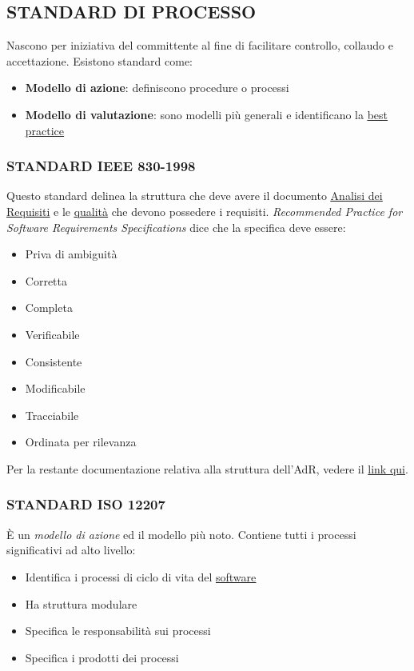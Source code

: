 		\subsection{STANDARD DI PROCESSO}  \label{standard}
		Nascono per iniziativa del committente al fine di facilitare controllo, collaudo e accettazione.
		Esistono standard come:
		\begin{itemize}
			\item \textbf{Modello di azione}: definiscono procedure o processi
			\item \textbf{Modello di valutazione}: sono modelli più generali e identificano la \underline{\hyperref[best]{best practice}}
		\end{itemize}


			\subsubsection{STANDARD IEEE 830-1998}	 \label{ieee830}
			Questo standard delinea la struttura che deve avere il documento \underline{\hyperref[analisideirequisiti]{Analisi dei Requisiti}} e le \underline{\hyperref[qualita]{qualità}} che devono possedere i requisiti.
			\textit{Recommended Practice for Software Requirements Specifications} dice che la specifica deve essere:
				\begin{itemize}
					\item Priva di ambiguità
					\item Corretta
					\item Completa
					\item Verificabile
					\item Consistente
					\item Modificabile
					\item Tracciabile
					\item Ordinata per rilevanza
				\end{itemize}
			Per la restante documentazione relativa alla struttura dell'AdR, vedere il \href{https://www.cs.purdue.edu/homes/apm/courses/BITSC461-fall03_SoftwareEngineering/miller-guidelines/IEEE830-1998.html}{link qui}.


			\subsubsection{STANDARD ISO 12207}		\label{12207}
			È un \textit{modello di azione} ed il modello più noto. Contiene tutti i processi significativi ad alto livello:
			\begin{itemize}
				\item Identifica i processi di ciclo di vita del \underline{\hyperref[prodotto]{software}}
				\item Ha struttura modulare
				\item Specifica le responsabilità sui processi
				\item Specifica i prodotti dei processi
			\end{itemize}

